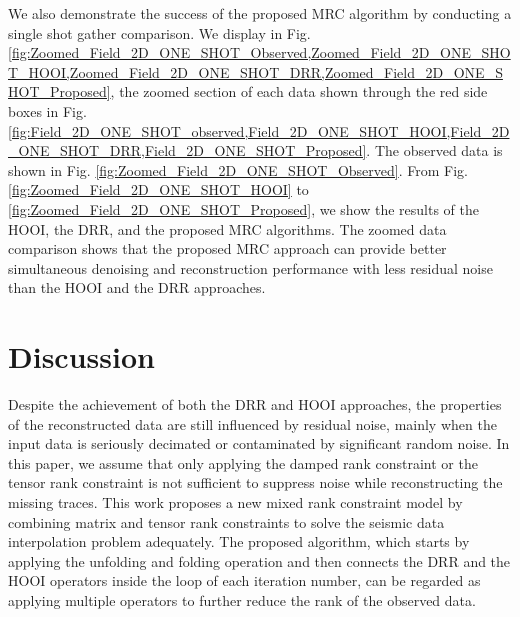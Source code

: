 
We also demonstrate the success of the proposed MRC algorithm by conducting a single shot gather comparison. We display in Fig. \ref{fig:Zoomed_Field_2D_ONE_SHOT_Observed,Zoomed_Field_2D_ONE_SHOT_HOOI,Zoomed_Field_2D_ONE_SHOT_DRR,Zoomed_Field_2D_ONE_SHOT_Proposed}, the zoomed section of each data shown through the red side boxes in Fig. \ref{fig:Field_2D_ONE_SHOT_observed,Field_2D_ONE_SHOT_HOOI,Field_2D_ONE_SHOT_DRR,Field_2D_ONE_SHOT_Proposed}. The observed data is shown in Fig. \ref{fig:Zoomed_Field_2D_ONE_SHOT_Observed}. From Fig. \ref{fig:Zoomed_Field_2D_ONE_SHOT_HOOI} to \ref{fig:Zoomed_Field_2D_ONE_SHOT_Proposed}, we show the results of the HOOI, the DRR, and the proposed MRC algorithms. The zoomed data comparison shows that the proposed MRC approach can provide better simultaneous denoising and reconstruction performance with less residual noise than the HOOI and the DRR approaches. 



\section{Discussion}

Despite the achievement of both the DRR and HOOI approaches, the properties of the reconstructed data are still influenced by  residual noise, mainly when the input data is seriously decimated or contaminated by significant random noise. In this paper, we assume that only applying the damped rank constraint or the tensor rank constraint is not sufficient to suppress noise while reconstructing the missing traces. This work proposes a new mixed rank constraint model by combining matrix and tensor rank constraints to solve the seismic data interpolation problem adequately. The proposed  algorithm, which starts by applying the unfolding and folding operation and then connects the DRR and the HOOI operators inside the loop of each iteration number, can be regarded as applying multiple operators to further reduce the rank of the observed data.  

